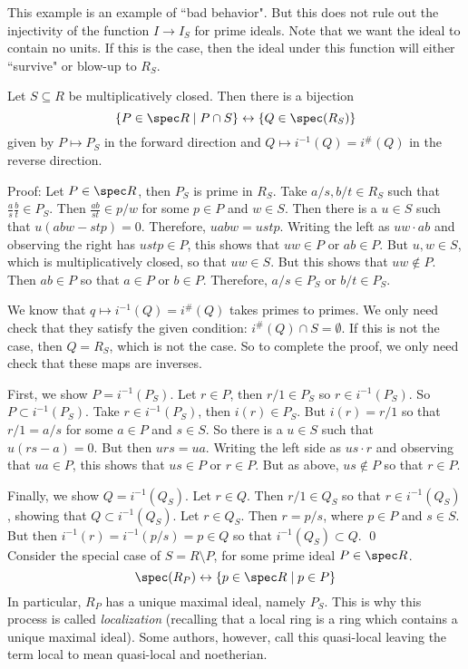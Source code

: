 This example is an example of ``bad behavior". But this does not rule out the injectivity of the function $I \to I_S$ for prime ideals. Note that we want the ideal to contain no units. If this is the case, then the ideal under this function will either ``survive" or blow-up to $R_S$. 

\begin{thmm}
Let $S \subseteq R$ be multiplicatively closed. Then there is a bijection
\[
\{P \in \spec R \;|\; P \cap S\} \leftrightarrow \{Q \in \spec(R_S)\} 
\]
given by $P \mapsto P_S$ in the forward direction and $Q \mapsto i^{-1}(Q)=i^{\#}(Q)$ in the reverse direction. 
\end{thmm}

\noindent Proof: Let $P \in \spec R$, then $P_S$ is prime in $R_S$. Take $a/s,b/t \in R_S$ such that $\frac{a}{s} \frac{b}{t} \in P_S$. Then $\frac{ab}{st} \in p/w$ for some $p \in P$ and $w \in S$. Then there is a $u \in S$ such that $u(abw-stp)=0$. Therefore, $uabw=ustp$. Writing the left as $uw \cdot ab$ and observing the right has $ustp \in P$, this shows that $uw \in P$ or $ab \in P$. But $u,w \in S$, which is multiplicatively closed, so that $uw \in S$. But this shows that $uw \notin P$. Then $ab \in P$ so that $a \in P$ or $b \in P$. Therefore, $a/s \in P_S$ or $b/t \in P_S$. 

We know that $q \mapsto i^{-1}(Q)=i^{\#}(Q)$ takes primes to primes. We only need check that they satisfy the given condition: $i^{\#}(Q) \cap S = \emptyset$. If this is not the case, then $Q=R_S$, which is not the case. So to complete the proof, we only need check that these maps are inverses. 

First, we show $P=i^{-1}(P_S)$. Let $r \in P$, then $r/1 \in P_S$ so $r \in i^{-1}(P_S)$. So $P \subset i^{-1}(P_S)$. Take $r \in i^{-1}(P_S)$, then $i(r) \in P_S$. But $i(r)=r/1$ so that $r/1=a/s$ for some $a \in P$ and $s \in S$. So there is a $u \in S$ such that $u(rs-a)=0$. But then $urs=ua$. Writing the left side as $us \cdot r$ and observing that $ua \in P$, this shows that $us \in P$ or $r \in P$. But as above, $us \notin P$ so that $r \in P$. 

Finally, we show $Q=i^{-1}(Q_S)$. Let $r \in Q$. Then $r/1 \in Q_S$ so that $r \in i^{-1}(Q_S)$, showing that $Q \subset i^{-1}(Q_S)$. Let $r \in Q_S$. Then $r= p/s$, where $p \in P$ and $s \in S$. But then $i^{-1}(r)=i^{-1}(p/s)=p \in Q$ so that $i^{-1}(Q_S) \subset Q$. \qed \\

Consider the special case of $S=R \setminus P$, for some prime ideal $P \in \spec R$. 
\[
\spec(R_P) \leftrightarrow \{p \in \spec R \;|\; p \in P\}
\]
In particular, $R_P$ has a unique maximal ideal, namely $P_S$. This is why this process is called \emph{localization} (recalling that a local ring is a ring which contains a unique maximal ideal). Some authors, however, call this quasi-local leaving the term local to mean quasi-local and noetherian. 

